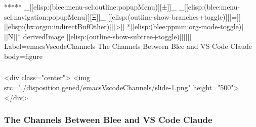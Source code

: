\begin{whenOrg}
\begin{verblatex}
\begin{frame}[fragile,plain,label=emacsVscodePairing]

\end{frame}
\end{verblatex}



\begin{whenOrg}
*****  _[[elisp:(blee:menu-sel:outline:popupMenu)][±]]_ _[[elisp:(blee:menu-sel:navigation:popupMenu)][Ξ]]_ [[elisp:(outline-show-branches+toggle)][|=]] [[elisp:(bx:orgm:indirectBufOther)][|>]] *[[elisp:(blee:ppmm:org-mode-toggle)][|N]]*  derivedImage [[elisp:(outline-show-subtree+toggle)][||]] Label=emacsVscodeChannels The Channels Between Blee and VS Code Claude body=figure
\end{whenOrg}

\begin{htmlonly}

\begin{frame}[fragile,plain,label=emacsVscodeChannels]
    \frametitle{}
    \framesubtitle{}
    \begin{rawhtml}
<div class="center">
<img src="./disposition.gened/emacsVscodeChannels/slide-1.png" height="500">
</div>
    \end{rawhtml}
\end{frame}
\end{htmlonly}

\begin{verblatex}

\begin{frame}[fragile,plain,label=emacsVscodeChannels]
    \frametitle{The Channels Between Blee and VS Code Claude}
    \framesubtitle{}


\end{frame}
\end{verblatex}
\end{whenOrg}

